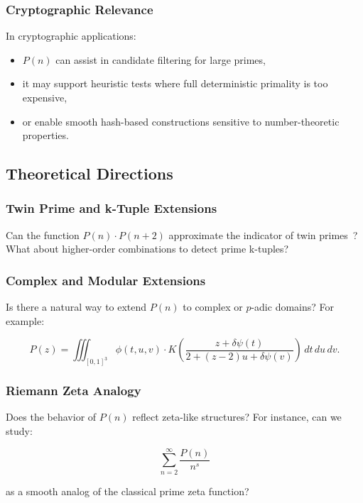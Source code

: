 \documentclass[12pt]{article}
\theoremstyle{definition}
\theoremstyle{plain}
\theoremstyle{remark}
\begin{document}
\subsubsection{Cryptographic Relevance}

In cryptographic applications:
\begin{itemize}
  \item \( P(n) \) can assist in candidate filtering for large primes,
  \item it may support heuristic tests where full deterministic primality is too expensive,
  \item or enable smooth hash-based constructions sensitive to number-theoretic properties.
\end{itemize}

\subsection{Theoretical Directions}

\subsubsection{Twin Prime and k-Tuple Extensions}

Can the function \( P(n) \cdot P(n+2) \) approximate the indicator of twin primes~\cite{ribenboim1996book}? What about higher-order combinations to detect prime k-tuples?

\subsubsection{Complex and Modular Extensions}

Is there a natural way to extend \( P(n) \) to complex or \( p \)-adic domains? For example:

\[
P(z) = \iiint_{[0,1]^3} \phi(t,u,v) \cdot K\left( \frac{z + \delta \psi(t)}{2 + (z-2)u + \delta \psi(v)} \right) \, dt \, du \, dv.
\]

\subsubsection{Riemann Zeta Analogy}

Does the behavior of \( P(n) \) reflect zeta-like structures? For instance, can we study:

\[
\sum_{n=2}^\infty \frac{P(n)}{n^s}
\]

as a smooth analog of the classical prime zeta function?
\end{document}
